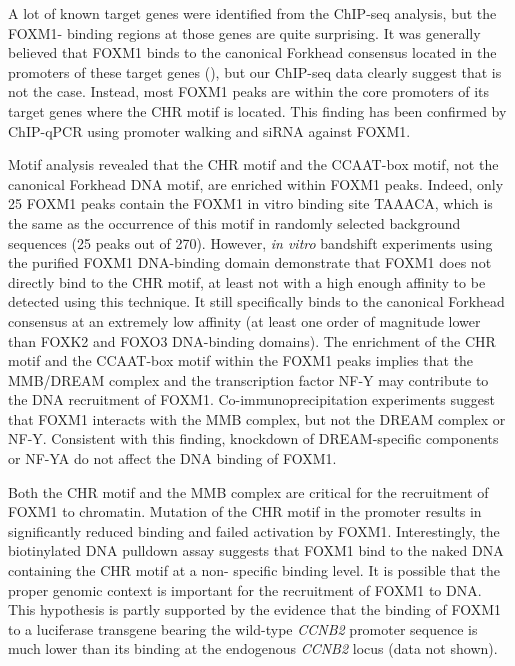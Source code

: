 A lot of known target genes were identified from the ChIP-seq analysis, but the FOXM1- binding regions at those genes are quite surprising. It was generally believed that FOXM1 binds to the canonical Forkhead consensus located in the promoters of these target genes (\cite{wang2005forkhead}), but our ChIP-seq data clearly suggest that is not the case. Instead, most FOXM1 peaks are within the core promoters of its target genes where the CHR motif is located. This finding has been confirmed by ChIP-qPCR using promoter walking and siRNA against FOXM1.

Motif analysis revealed that the CHR motif and the CCAAT-box motif, not the canonical Forkhead DNA motif, are enriched within FOXM1 peaks. Indeed, only 25 FOXM1 peaks contain the FOXM1 in vitro binding site TAAACA, which is the same as the occurrence of this motif in randomly selected background sequences (25 peaks out of 270). However, \textit{in vitro} bandshift experiments using the purified FOXM1 DNA-binding domain demonstrate that FOXM1 does not directly bind to the CHR motif, at least not with a high enough affinity to be detected using this technique. It still specifically binds to the canonical Forkhead consensus at an extremely low affinity (at least one order of magnitude lower than FOXK2 and FOXO3 DNA-binding domains). The enrichment of the CHR motif and the CCAAT-box motif within the FOXM1 peaks implies that the MMB/DREAM complex and the transcription factor NF-Y may contribute to the DNA recruitment of FOXM1. Co-immunoprecipitation experiments suggest that FOXM1 interacts with the MMB complex, but not the DREAM complex or NF-Y. Consistent with this finding, knockdown of DREAM-specific components or NF-YA do not affect the DNA binding of FOXM1.

Both the CHR motif and the MMB complex are critical for the recruitment of FOXM1 to chromatin. Mutation of the CHR motif in the promoter results in significantly reduced binding and failed activation by FOXM1. Interestingly, the biotinylated DNA pulldown assay suggests that FOXM1 bind to the naked DNA containing the CHR motif at a non- specific binding level. It is possible that the proper genomic context is important for the recruitment of FOXM1 to DNA. This hypothesis is partly supported by the evidence that the binding of FOXM1 to a luciferase transgene bearing the wild-type \textit{CCNB2} promoter sequence is much lower than its binding at the endogenous \textit{CCNB2} locus (data not shown).

